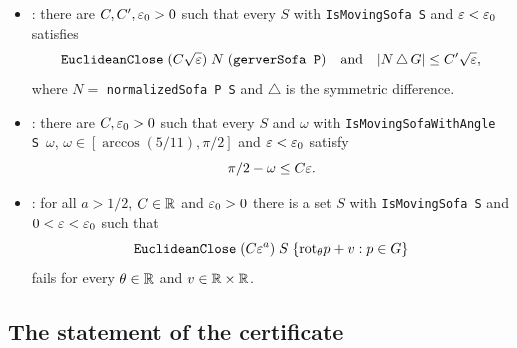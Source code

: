 \begin{itemize}
\item {}: there are $C,C',\varepsilon_0>0$ such that every
$S$ with \texttt{IsMovingSofa S} and $\varepsilon<\varepsilon_0$ satisfies
\[
  \texttt{EuclideanClose}\; (C\sqrt{\varepsilon})\; N\; (\texttt{gerverSofa P})
  \quad\text{and}\quad\lvert N\,\triangle\,G\rvert\le C'\sqrt{\varepsilon} ,
\]
where $N=$ \texttt{normalizedSofa P S} and $\triangle$ is the symmetric
difference.
\item {}: there are $C,\varepsilon_0>0$ such that
every $S$ and $\omega$ with \texttt{IsMovingSofaWithAngle S}~$\omega$,
$\omega\in[\arccos(5/11),\pi/2]$ and $\varepsilon<\varepsilon_0$ satisfy
\[
  \pi/2-\omega\le C\varepsilon .
\]
\item {}: for all $a>1/2$, $C\in\mathbb{R}$ and
$\varepsilon_0>0$ there is a set $S$ with \texttt{IsMovingSofa S} and $0<\varepsilon<\varepsilon_0$
such that
\[
  \texttt{EuclideanClose}\; (C\varepsilon^a)\; S\; \{\mathrm{rot}_\theta p+v:p\in G\}
\]
fails for every $\theta\in\mathbb{R}$ and $v\in\mathbb{R}\times\mathbb{R}$.
\end{itemize}

\subsection{The statement of the certificate}\label{app:lean-certificate}

